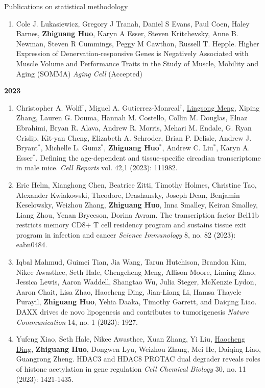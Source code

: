 \documentclass{resume} %
\begin{document}
\begin{rSection}{Publications on statistical methodology}
\begin{enumerate}[noitemsep,topsep=0pt, resume]
\item 
Cole J. Lukasiewicz, Gregory J Tranah, Daniel S Evans, Paul Coen, Haley Barnes, {\bf Zhiguang Huo}, Karyn A Esser, Steven Kritchevsky, Anne B. Newman, Steven R Cummings, Peggy M Cawthon, Russell T. Hepple. 
Higher Expression of Denervation-responsive Genes is Negatively Associated with Muscle Volume and Performance Traits in the Study of Muscle, Mobility and Aging (SOMMA)
\emph{Aging Cell} (Accepted)
\label{bioinfo_39} 

\end{enumerate}

\textbf{2023}
\begin{enumerate}[noitemsep,topsep=0pt, resume]

\item 
Christopher A. Wolff$^\dagger$, Miguel A. Gutierrez-Monreal$^\dagger$, \underline{Lingsong Meng}, Xiping Zhang, Lauren G. Douma, Hannah M. Costello, Collin M. Douglas, Elnaz Ebrahimi, Bryan R. Alava, Andrew R. Morris, Mehari M. Endale, G. Ryan Crislip, Kit-yan Cheng, Elizabeth A. Schroder, Brian P. Delisle, Andrew J. Bryant$^*$, Michelle L. Gumz$^*$, {\bf Zhiguang Huo}$^*$, Andrew C. Liu$^*$, Karyn A. Esser$^*$.
Defining the age-dependent and tissue-specific circadian transcriptome in male mice.
\emph{Cell Reports} vol. 42,1 (2023): 111982. 
\label{bioinfo_38} 
\label{shiny_1} 


\item
Eric Helm, Xianghong Chen, Beatrice Zitti, Timothy Holmes, Christine Tao, Alexander Kwiakowski, Theodore, Drashansky, Joseph Dean, Benjamin Keselowsky, Weizhou Zhang,  {\bf Zhiguang Huo}, Inna Smalley, Keiran Smalley, Liang Zhou, Yenan Bryceson, Dorina Avram.
The transcription factor Bcl11b restricts memory CD8+ T cell residency program and sustains tissue exit program in infection and cancer
\emph{Science Immunology}  8, no. 82 (2023): eabn0484.
\label{bioinfo_37} 


\item
Iqbal Mahmud, Guimei Tian, Jia Wang, Tarun Hutchison, Brandon Kim, Nikee Awasthee, Seth Hale, Chengcheng Meng, Allison Moore, Liming Zhao, Jessica Lewis, Aaron Waddell, Shangtao Wu, Julia Steger, McKenzie Lydon, Aaron Chait, Lisa Zhao, Haocheng Ding, Jian-Liang Li, Hamsa Thayele Purayil, {\bf Zhiguang Huo}, Yehia Daaka, Timothy Garrett, and Daiqing Liao.
DAXX drives de novo lipogenesis and contributes to tumorigenesis
\emph{Nature Communication} 14, no. 1 (2023): 1927.
\label{bioinfo_36} 


\item Yufeng Xiao, Seth Hale,  Nikee Awasthee,  Xuan Zhang,  Yi Liu,  \underline{Haocheng Ding}, {\bf Zhiguang Huo}, Dongwen Lyu,  Weizhou Zhang, Mei He, Daiqing Liao, Guangrong Zheng.
HDAC3 and HDAC8 PROTAC dual degrader reveals roles of histone acetylation in gene regulation
\emph{Cell Chemical Biology} 30, no. 11 (2023): 1421-1435.
\label{bioinfo_35} 



\end{enumerate}
\end{rSection}
\end{document}
